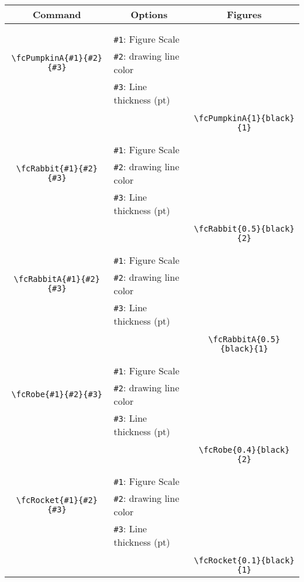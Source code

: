 \documentclass[x11names]{article}
\begin{document}
\begin{table}[H]\centering\begin{tabular}{|c|l|c|}\hline {\bf Command}& \multicolumn{1}{c|}{{\bf Options}} & {\bf Figures}\\  \hline	&&\multirow{5}{*}{\fcPumpkinA{1}{black}{1}}\\	&&\\	&\verb|#1|: Figure Scale &\\	\verb|\fcPumpkinA{#1}{#2}{#3}|&	\verb|#2|: drawing line color &\\	&\verb|#3|: Line thickness (pt) &\\ &&\\&&	\verb|\fcPumpkinA{1}{black}{1}|\\\hline 	
	&&\multirow{5}{*}{\fcRabbit{0.5}{black}{2}}\\	&&\\	&\verb|#1|: Figure Scale &\\	\verb|\fcRabbit{#1}{#2}{#3}|&	\verb|#2|: drawing line color &\\	&\verb|#3|: Line thickness (pt) &\\ &&\\&&	\verb|\fcRabbit{0.5}{black}{2}|\\\hline 	
	&&\multirow{5}{*}{\fcRabbitA{0.5}{black}{1}}\\	&&\\	&\verb|#1|: Figure Scale &\\	\verb|\fcRabbitA{#1}{#2}{#3}|&	\verb|#2|: drawing line color &\\	&\verb|#3|: Line thickness (pt) &\\ &&\\&&	\verb|\fcRabbitA{0.5}{black}{1}|\\\hline 	
	&&\multirow{5}{*}{\fcRobe{0.4}{black}{2}}\\	&&\\	&\verb|#1|: Figure Scale &\\	\verb|\fcRobe{#1}{#2}{#3}|&	\verb|#2|: drawing line color &\\	&\verb|#3|: Line thickness (pt) &\\ &&\\&&	\verb|\fcRobe{0.4}{black}{2}|\\\hline 	
	&&\multirow{5}{*}{\fcRocket{0.1}{black}{1}}\\	&&\\	&\verb|#1|: Figure Scale &\\	\verb|\fcRocket{#1}{#2}{#3}|&	\verb|#2|: drawing line color &\\	&\verb|#3|: Line thickness (pt) &\\ &&\\&&	\verb|\fcRocket{0.1}{black}{1}|\\\hline 	

\end{tabular}
\end{table}
\end{document}

